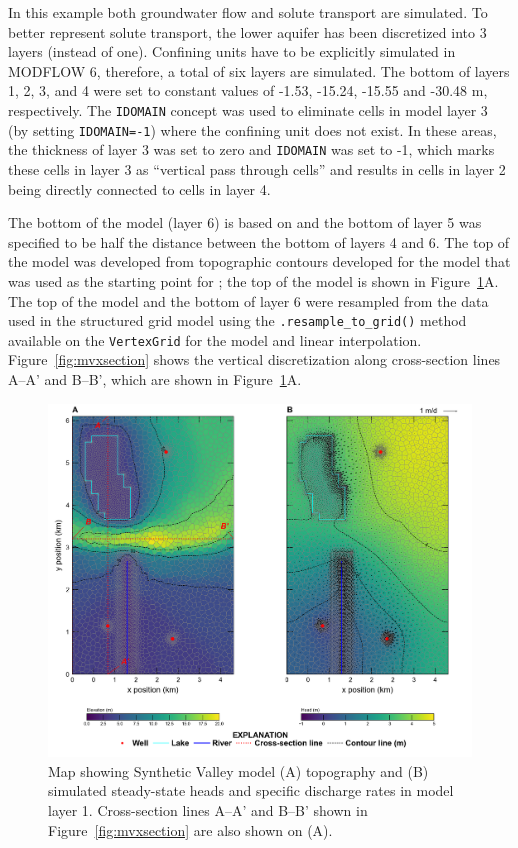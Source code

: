 \documentclass[12pt, oneside]{article}  	%
\begin{document}
In this example both groundwater flow and solute transport are simulated. To better represent solute transport, the lower aquifer has been discretized into 3 layers (instead of one). Confining units have to be explicitly simulated in MODFLOW 6, therefore, a total of six layers are simulated. The bottom of layers 1, 2, 3, and 4 were set to constant values of -1.53, -15.24, -15.55 and -30.48 m, respectively. The \texttt{IDOMAIN} concept \citep{modflow6gwf} was used to eliminate cells in model layer 3 (by setting \texttt{IDOMAIN=-1}) where the confining unit does not exist. In these areas, the thickness of layer 3 was set to zero and \texttt{IDOMAIN} was set to -1, which marks these cells in layer 3 as ``vertical pass through cells'' and results in cells in layer 2 being directly connected to cells in layer 4. 

The bottom of the model (layer 6) is based on \cite{hill1998} and the bottom of layer 5 was specified to be half the distance between the bottom of layers 4 and 6. The top of the model was developed from topographic contours developed for the model that was used as the starting point for \cite{hill1998} \citep{pollock2014percomm}; the top of the model is shown in Figure~\ref{fig:mvmap}A. The top of the model and the bottom of layer 6 were resampled from the data used in the structured grid model using the \texttt{.resample\_to\_grid()} method available on the \texttt{VertexGrid} for the model and linear interpolation. Figure~\ref{fig:mvxsection} shows the vertical discretization along cross-section lines A--A' and B--B', which are shown in Figure~\ref{fig:mvmap}A.

\begin{figure}[ht!]
	\begin{center}
		\includegraphics{figures/mv_voronoi_map.png}
	\end{center}
	\caption{Map showing Synthetic Valley model (A) topography and (B) simulated steady-state heads and specific discharge rates in model layer 1. Cross-section lines A--A' and B--B' shown in Figure~\ref{fig:mvxsection} are also shown on (A).}
	\label{fig:mvmap}
\end{figure}
\end{document}
